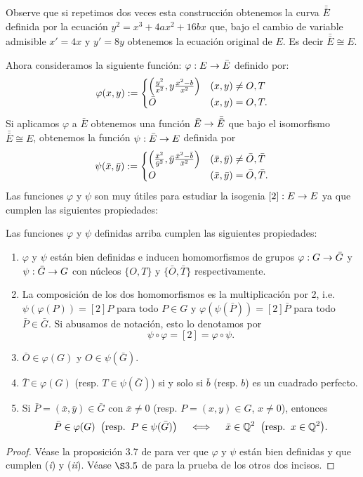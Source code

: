 \documentclass[../../tesis_maestria]{subfiles}
\begin{document}
Observe que si repetimos dos veces esta construcción obtenemos la curva $\bar{\bar{E}}$ definida por la ecuación $y^2=x^3+4ax^2+16bx$ que, bajo el cambio de variable admisible $x'=4x$ y $y'=8y$ obtenemos la ecuación original de $E$. Es decir $\bar{\bar{E}}\cong E$. 

Ahora consideramos la siguiente función: $\varphi:E\rightarrow \bar{E}$ definido por:
\[
	\varphi(x,y):=\begin{cases}
		\left( \tfrac{y^2}{x^2},y\tfrac{x^2-b}{x^2} \right) & (x,y)\neq O,T\\
		\bar{O} & (x,y)=O,T.
	\end{cases}
\]
Si aplicamos $\varphi$ a $\bar{E}$ obtenemos una función $\bar{E}\rightarrow\bar{\bar{E}}$ que bajo el isomorfismo $\bar{\bar{E}}\cong E$, obtenemos la función $\psi:\bar{E}\rightarrow E$ definida por
\[
	\psi(\bar{x},\bar{y}):=\begin{cases}
		\left( \tfrac{\bar{x}^2}{\bar{y}^2},\bar{y}\tfrac{\bar{x}^2-\bar{b}}{\bar{x}^2} \right) & (\bar{x},\bar{y})\neq \bar{O},\bar{T}\\
		O & (\bar{x},\bar{y})=\bar{O},\bar{T}.
	\end{cases}
\]
Las funciones $\varphi$ y $\psi$ son muy útiles para estudiar la isogenia $[2]:E\rightarrow E$ ya que cumplen las siguientes propiedades:

\begin{prop}\label{prop:descomponer-2}
	Las funciones $\varphi$ y $\psi$ definidas arriba cumplen las siguientes propiedades:
	\begin{enumerate}[label=(\roman*)]
		\item $\varphi$ y $\psi$ están bien definidas e inducen homomorfismos de grupos $\varphi:G\rightarrow \bar{G}$ y $\psi:\bar{G}\rightarrow G$ con núcleos $\{O,T\}$ y $\{\bar{O},\bar{T}\}$ respectivamente.
		\item\label{in:mult2} La composición de los dos homomorfismos es la multiplicación por 2, i.e. $\psi(\varphi(P))=[2]P$ para todo $P\in G$ y $\varphi(\psi(\bar{P}))=[2]\bar{P}$ para todo $\bar{P}\in\bar{G}$. Si abusamos de notación, esto lo denotamos por $$\psi\circ\varphi=[2]=\varphi\circ\psi.$$
		\item\label{in:0imagen} $\bar{O}\in\varphi(G)$ y $O\in\psi(\bar{G})$.
		\item\label{in:imagenTbar} $\bar{T}\in\varphi(G)$ (resp. $T\in\psi(\bar{G})$) si y solo si $\bar{b}$ (resp. $b$) es un cuadrado perfecto.
		\item\label{in:imagen} Si $\bar{P}=(\bar{x},\bar{y})\in\bar{G}$ con $\bar{x}\neq0$ (resp. $P=(x,y)\in G$, $x\neq0$), entonces
		\[
			\bar{P}\in\varphi(G)\;\;\big(\mathrm{resp}.\;\; P\in\psi(\bar{G})\big)\quad\iff\quad\bar{x}\in\mathbb{Q}^2\;\;\big(\mathrm{resp}.\;\; x\in\mathbb{Q}^2 \big).
		\]
	\end{enumerate}
\end{prop}
\begin{proof}
		Véase la proposición 3.7 de \cite{SilvermanTateRPOEC} para ver que $\varphi$ y $\psi$ están bien definidas y que cumplen (\emph{i}) y (\emph{ii}). Véase $\S3.5$ de \cite{SilvermanTateRPOEC} para la prueba de los otros dos incisos.
\end{proof}
\end{document}
